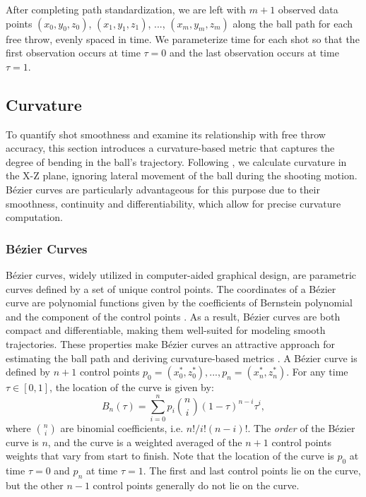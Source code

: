 \documentclass{article}
\begin{document}
      After completing path standardization, we are left with $m + 1$ observed data points \((x_0, y_0, z_0)\), \((x_1, y_1, z_1)\), ..., \((x_m, y_m, z_m)\) along the ball path for each free throw, evenly spaced in time. We parameterize time for each shot so that the first observation occurs at time $\tau = 0$ and the last observation occurs at time $\tau = 1$.

    \subsection{Curvature}
    \label{sec:curvature}
    
    To quantify shot smoothness and examine its relationship with free throw accuracy, this section introduces a curvature-based metric that captures the degree of bending in the ball's trajectory. Following \citet{slegers_role_2024}, we calculate curvature in the X-Z plane, ignoring lateral movement of the ball during the shooting motion. Bézier curves are particularly advantageous for this purpose due to their smoothness, continuity and differentiability, which allow for precise curvature computation. 

        \subsubsection{Bézier Curves}

            Bézier curves, widely utilized in computer-aided graphical design, are parametric curves defined by a set of unique control points. The coordinates of a Bézier curve are polynomial functions given by the coefficients of Bernstein polynomial and the component of the control points \citep{baydas_defining_2019}. As a result, Bézier curves are both compact and differentiable, making them well-suited for modeling smooth trajectories. These properties make Bézier curves an attractive approach for estimating the ball path and deriving curvature-based metrics \citep{slegers_role_2024}. A Bézier curve is defined by \(n + 1\) control points \(p_0 = (x_0^*, z_0^*), ..., p_n = (x_n^*, z_n^*)\). For any time \(\tau \in [0, 1]\), the location of the curve is given by:
            \begin{equation}
              \label{eqn:bezier}
              B_n(\tau) = \sum_{i=0}^{n} p_i \binom{n}{i} (1 - \tau)^{n-i} \tau^i,
            \end{equation}
            where \( \binom{n}{i} \) are binomial coefficients, i.e. $n! / i! (n - i)!$. The {\it order} of the Bézier curve is \(n\), and the curve is a weighted averaged of the \(n+1\) control points weights that vary from start to finish. Note that the location of the curve is \(p_0\) at time \(\tau =0\) and \(p_n\) at time \(\tau=1\). The first and last control points lie on the curve, but the other \(n - 1\) control points generally do not lie on the curve.
\end{document}
